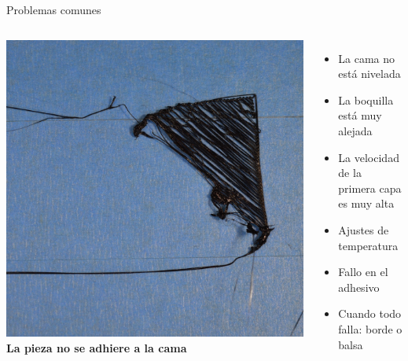 \documentclass{beamer}
\begin{document}
	\begin{frame}{Problemas comunes}
		\begin{columns}
				\includegraphics[width=\textwidth]{images/Print-Not-Sticking-To-Bed}
				\textbf{La pieza no se adhiere a la cama}
				\begin{itemize}
					\item La cama no está nivelada
					\item La boquilla está muy alejada
					\item La velocidad de la primera capa es muy alta
					\item Ajustes de temperatura
					\item Fallo en el adhesivo
					\item Cuando todo falla: borde o balsa
				\end{itemize}
		\end{columns}
	\end{frame}
\end{document}
